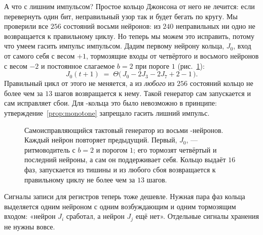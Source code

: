 А что с лишним импульсом? Простое кольцо Джонсона от него не лечится: если перевернуть один бит, неправильный узор так и будет бегать по кругу. Мы проверили все $256$ состояний восьми нейронов: из $240$ неправильных ни одно не возвращается к правильному циклу. Но теперь мы можем это исправить, потому что умеем гасить импульс импульсом. Дадим первому нейрону кольца, $J_0$, вход от самого себя с весом $+1$, тормозящие входы от четвёртого и восьмого нейронов с весом $-2$ и постоянное слагаемое $b=2$ при пороге $1$ (рис.~\ref{fig:johnson}):
\begin{equation}
J_0(t+1) \;=\; \Theta\bigl(\,J_0 - 2J_3 - 2J_7 + 2 - 1\,\bigr).
\label{eq:johnsonfix}
\end{equation}
Правильный цикл от этого не меняется, а из \emph{любого} из $256$ состояний кольцо не более чем за $13$ шагов возвращается к нему. Такой генератор сам запускается и сам исправляет сбои. Для -кольца это было невозможно в принципе: утверждение~\ref{prop:monotone} запрещало гасить лишний импульс.

\begin{figure}[t]
\centering
{}
\caption{Самоисправляющийся тактовый генератор из восьми -нейронов. Каждый нейрон повторяет предыдущий. Первый, $J_0$, --- ритмоводитель с $b=2$ и порогом $1$; его тормозят четвёртый и последний нейроны, а сам он поддерживает себя. Кольцо выдаёт $16$ фаз, запускается из тишины и из любого сбоя возвращается к правильному циклу не более чем за $13$ шагов.}
\label{fig:johnson}
\end{figure}

Сигналы записи для регистров теперь тоже дешевле. Нужная пара фаз кольца выделяется одним нейроном с одним возбуждающим и одним тормозящим входом: «нейрон $J_i$ сработал, а нейрон $J_j$ ещё нет». Отдельные сигналы хранения не нужны вовсе.

